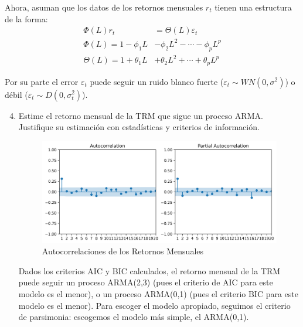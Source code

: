 \documentclass{article}
\theoremstyle{remark}
\theoremstyle{definition}
\begin{document}
{Ahora, asuman que los datos de los retornos mensuales $r_t$ tienen una estructura de la forma:}
\begin{align*}
    \Phi(L)r_t &= \Theta(L)\varepsilon_t \\
    \Phi(L) = 1 − \phi_1L &− \phi_2L^2 − \cdots − \phi_pL^p \\
    \Theta(L) = 1 + \theta_1L &+ \theta_2L^2 + \cdots + \theta_pL^p
\end{align*}

{Por su parte el error $\varepsilon_t$ puede seguir un ruido blanco fuerte ($\varepsilon_t\sim WN(0,
\sigma^2)$) o débil ($\varepsilon_t\sim D(0,\sigma_t^2)$).}

\begin{enumerate}[label = \emph{\alph*})]\setcounter{enumi}{3}
    \item {Estime el retorno mensual de la TRM que sigue un proceso ARMA. Justifique su estimaci\'on con estad\'isticas y criterios de informaci\'on.}
        \begin{tcolorbox}[title=Soluci\'on 2.d]
            
            \begin{figure}[H]
                \centering
                \includegraphics[width=0.9\linewidth]{output/acf_pacf_retornos.png}
                \caption{Autocorrelaciones de los Retornos Mensuales}
                \label{fig:corr_ret}
            \end{figure}
            
            

Dados los criterios AIC y BIC calculados, el retorno mensual de la TRM puede seguir un proceso ARMA(2,3) (pues el criterio de AIC para este modelo es el menor), o un proceso ARMA(0,1) (pues el criterio BIC para este modelo es el menor). Para escoger el modelo apropiado, seguimos el criterio de parsimonia: escogemos el modelo más simple, el ARMA(0,1).

   
        \end{tcolorbox}


\end{enumerate}
\end{document}
